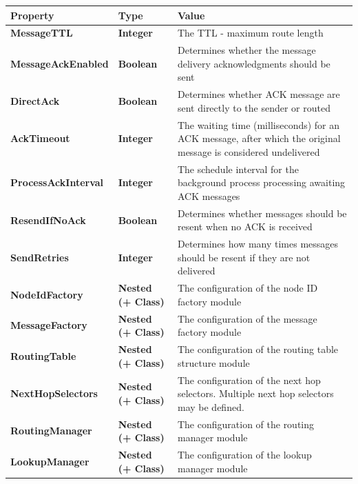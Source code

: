 \begin{table}
\scriptsize
\begin{center}
\begin{tabular}{p{3.5cm} p{2.5cm} p{8.5cm}}
	\hline
	\textbf{Property}					& \textbf{Type}				& \textbf{Value}					\\[1mm]
    \hline
    \textbf{MessageTTL}					& \textbf{Integer}				& The TTL - maximum route length													\\[1.5mm]
	\textbf{MessageAckEnabled}			& \textbf{Boolean}				& Determines whether the message delivery acknowledgments should be sent			\\[1.5mm]
	\textbf{DirectAck}					& \textbf{Boolean}				& Determines whether ACK message are sent directly to the sender or routed			\\[1.5mm]
	\textbf{AckTimeout}					& \textbf{Integer}				& The waiting time (milliseconds) for an ACK message, after which the original message is considered undelivered 			\\[1.5mm]
	\textbf{ProcessAckInterval}			& \textbf{Integer}				& The schedule interval for the background process processing awaiting ACK messages		\\[1.5mm]
	\textbf{ResendIfNoAck}				& \textbf{Boolean}				& Determines whether messages should be resent when no ACK is received					\\[1.5mm]
	\textbf{SendRetries}				& \textbf{Integer}				& Determines how many times messages should be resent if they are not delivered			\\[1.5mm]
	\textbf{NodeIdFactory}				& \textbf{Nested (+ Class)}		& The configuration of the node ID factory module										\\[1.5mm]
	\textbf{MessageFactory}				& \textbf{Nested (+ Class)}		& The configuration of the message factory module										\\[1.5mm]
	\textbf{RoutingTable}				& \textbf{Nested (+ Class)}		& The configuration of the routing table structure module								\\[1.5mm]
	\textbf{NextHopSelectors}			& \textbf{Nested (+ Class)}		& The configuration of the next hop selectors. Multiple next hop selectors may be defined.		\\[1.5mm]
	\textbf{RoutingManager}				& \textbf{Nested (+ Class)}		& The configuration of the routing manager module										\\[1.5mm]
	\textbf{LookupManager}				& \textbf{Nested (+ Class)}		& The configuration of the lookup manager module										\\[1.5mm]

\end{tabular}
\end{center}
\end{table}
